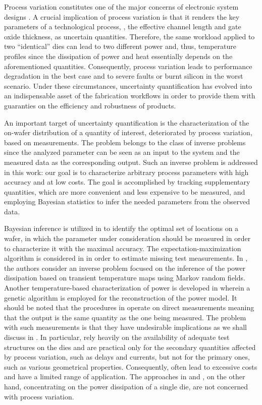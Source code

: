 Process variation constitutes one of the major concerns of electronic system designs \cite{chandrakasan2001, srivastava2010}. A crucial implication of process variation is that it renders the key parameters of a technological process, \eg, the effective channel length and gate oxide thickness, as uncertain quantities.
Therefore, the same workload applied to two ``identical'' dies can lead to two different power and, thus, temperature profiles since the dissipation of power and heat essentially depends on the aforementioned quantities.
Consequently, process variation leads to performance degradation in the best case and to severe faults or burnt silicon in the worst scenario.
Under these circumstances, uncertainty quantification has evolved into an indispensable asset of the fabrication workflows in order to provide them with guaranties on the efficiency and robustness of products.

An important target of uncertainty quantification is the characterization of the on-wafer distribution of a quantity of interest, deteriorated by process variation, based on measurements.
The problem belongs to the class of inverse problems since the analyzed parameter can be seen as an input to the system and the measured data as the corresponding output.
Such an inverse problem is addressed in this work: our goal is to characterize arbitrary process parameters with high accuracy and at low costs.
The goal is accomplished by tracking supplementary quantities, which are more convenient and less expensive to be measured, and employing Bayesian statistics \cite{gelman2004} to infer the needed parameters from the observed data.

Bayesian inference is utilized in \cite{zhang2010} to identify the optimal set of locations on a wafer, in which the parameter under consideration should be measured in order to characterize it with the maximal accuracy.
The expectation-maximization algorithm is considered in \cite{reda2009} in order to estimate missing test measurements.
In \cite{paek2012}, the authors consider an inverse problem focused on the inference of the power dissipation based on transient temperature maps using Markov random fields.
Another temperature-based characterization of power is developed in \cite{mesa-martinez2007} wherein a genetic algorithm is employed for the reconstruction of the power model.
It should be noted that the procedures in \cite{zhang2010, reda2009} operate on direct measurements meaning that the output is the same quantity as the one being measured.
The problem with such measurements is that they have undesirable implications as we shall discuss in .
In particular, \cite{zhang2010, reda2009} rely heavily on the availability of adequate test structures on the dies and are practical only for the secondary quantities affected by process variation, such as delays and currents, but not for the primary ones, such as various geometrical properties.
Consequently, \cite{zhang2010, reda2009} often lead to excessive costs and have a limited range of application.
The approaches in \cite{paek2012} and \cite{mesa-martinez2007}, on the other hand, concentrating on the power dissipation of a single die, are not concerned with process variation.

